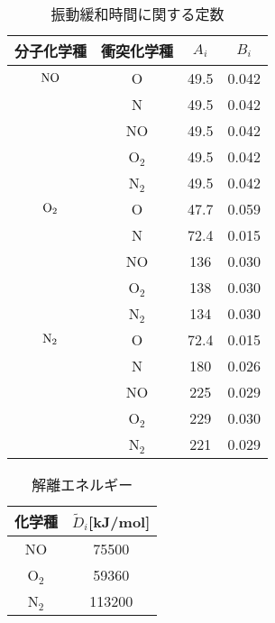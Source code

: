      \begin{table}[!htbp]
      \begin{center}
       \caption{振動緩和時間に関する定数}
        \begin{tabular}{c c c c} \hline \hline
      分子化学種 & 衝突化学種 & $A_i$ & $B_i$  \\ \hline 
      ${\rm NO} $ &  O       & 49.5 & 0.042 \\
                  &  N       & 49.5 & 0.042 \\
                  &  NO      & 49.5 & 0.042 \\
                  &  O${_2}$ & 49.5 & 0.042 \\
                  &  N${_2}$ & 49.5 & 0.042 \\ \hline
      ${\rm O{_2}} $ &  O    & 47.7 & 0.059 \\
                  &  N       & 72.4 & 0.015 \\
                  &  NO      & 136  & 0.030 \\
                  &  O${_2}$ & 138  & 0.030 \\
                  &  N${_2}$ & 134  & 0.030 \\ \hline
      ${\rm N{_2}} $ &  O    & 72.4 & 0.015 \\
                  &  N       & 180  & 0.026 \\
                  &  NO      & 225  & 0.029 \\
                  &  O${_2}$ & 229  & 0.030 \\
                  &  N${_2}$ & 221  & 0.029 \\  
                             \hline \hline
        \end{tabular}
       \label{tab:LTcoef}
      \end{center}
     \end{table} 

\clearpage

     \begin{table}[!htbp]
      \begin{center}
       \caption{解離エネルギー}
        \begin{tabular}{c c} \hline \hline
                        化学種 & ${\tilde D}_i$[kJ/mol]\\ \hline 
                             NO   & 75500 \\
                             O$_2$& 59360 \\
                             N$_2$&113200 \\ 
                             \hline \hline
        \end{tabular}
       \label{tab:decene}
      \end{center}
     \end{table} 

